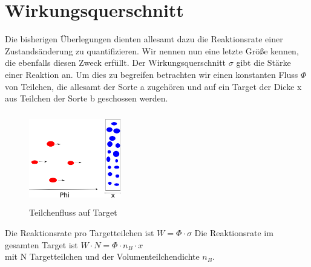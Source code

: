 \documentclass[Ex4_Zusammenfassung.tex]{subfiles}
\begin{document}
\section{Wirkungsquerschnitt}
Die bisherigen Überlegungen dienten allesamt dazu die Reaktionsrate einer Zustandsänderung zu quantifizieren. Wir nennen nun eine letzte Größe kennen, die ebenfalls diesen Zweck erfüllt.
Der Wirkungsquerschnitt $ \sigma $ gibt die Stärke einer Reaktion an. Um dies zu begreifen betrachten wir einen konstanten Fluss  $\Phi $ von Teilchen, die allesamt der Sorte a zugehören und auf ein Target der Dicke x aus Teilchen der Sorte b geschossen werden.  

\begin{figure}[h]
\centering
\includegraphics[height= 4cm, width=4cm]{fluss.png}
\caption{Teilchenfluss auf Target}
\end{figure}
Die Reaktionsrate pro Targetteilchen ist $ W = \Phi \cdot \sigma $ 
Die Reaktionsrate im gesamten Target ist $ W \cdot N = \Phi \cdot n_{B} \cdot x $ \\ 
mit N Targetteilchen und der Volumenteilchendichte $ n_B $. \newline
\end{document}
